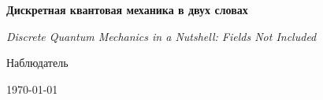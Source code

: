 \begin{titlepage}
  \centering
  \vspace*{2cm}
  {\LARGE\bfseries Дискретная квантовая механика в двух словах\par}
  \vspace{0.35cm}
  {\normalsize\itshape Discrete Quantum Mechanics in a Nutshell: Fields Not Included\par}
  \vspace{0.8cm}
  {\Large Наблюдатель\par}
  \vfill
  {\large \today\par}
\end{titlepage}
\clearpage

\clearpage
\tableofcontents
\clearpage

